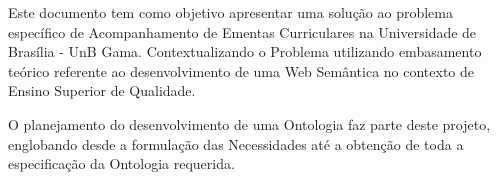 
Este documento tem como objetivo apresentar uma solução ao problema específico de Acompanhamento de Ementas Curriculares na Universidade de Brasília - UnB Gama. Contextualizando o Problema utilizando embasamento teórico referente ao desenvolvimento de uma Web Semântica no contexto de Ensino Superior de Qualidade.

O planejamento do desenvolvimento de uma Ontologia faz parte deste projeto, englobando desde a formulação das Necessidades até a obtenção de toda a especificação da Ontologia requerida.